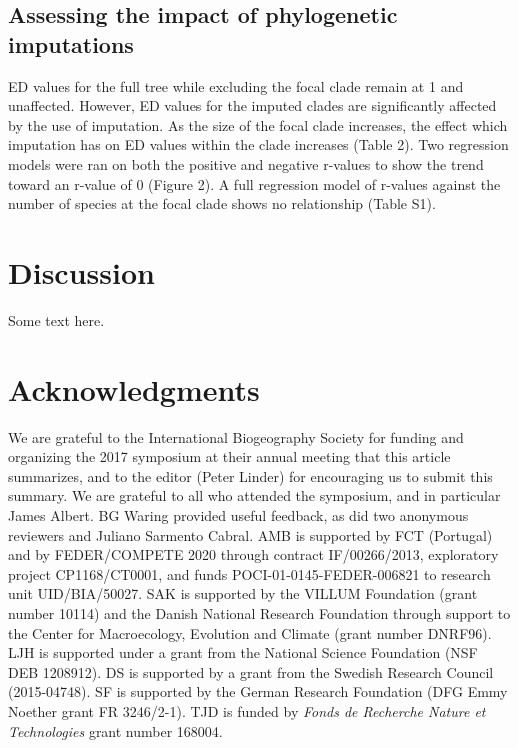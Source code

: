 \documentclass[12pt,english]{article}
\begin{document}
\subsection*{Assessing the impact of phylogenetic imputations}

ED values for the full tree while excluding the focal clade remain at
1 and unaffected. However, ED values for the imputed clades are
significantly affected by the use of imputation. As the size of the
focal clade increases, the effect which imputation has on ED values
within the clade increases (Table 2). Two regression models were ran
on both the positive and negative r-values to show the trend toward an
r-value of 0 (Figure 2). A full regression model of r-values against
the number of species at the focal clade shows no relationship (Table
S1).



\section*{Discussion}
Some text here.

\section*{Acknowledgments}
We are grateful to the International Biogeography Society for funding
and organizing the 2017 symposium at their annual meeting that this
article summarizes, and to the editor (Peter Linder) for encouraging
us to submit this summary. We are grateful to all who attended the
symposium, and in particular James Albert. BG Waring provided useful
feedback, as did two anonymous reviewers and Juliano Sarmento
Cabral. AMB is supported by FCT (Portugal) and by FEDER/COMPETE 2020
through contract IF/00266/2013, exploratory project CP1168/CT0001, and
funds POCI-01-0145-FEDER-006821 to research unit UID/BIA/50027.  SAK
is supported by the VILLUM Foundation (grant number 10114) and the
Danish National Research Foundation through support to the Center for
Macroecology, Evolution and Climate (grant number DNRF96).  LJH is
supported under a grant from the National Science Foundation (NSF DEB
1208912).  DS is supported by a grant from the Swedish Research
Council (2015-04748). SF is supported by the German Research
Foundation (DFG Emmy Noether grant FR 3246/2-1). TJD is funded by
\emph{Fonds de Recherche Nature et Technologies} grant number 168004.
\clearpage
\printbibliography
\end{document}
